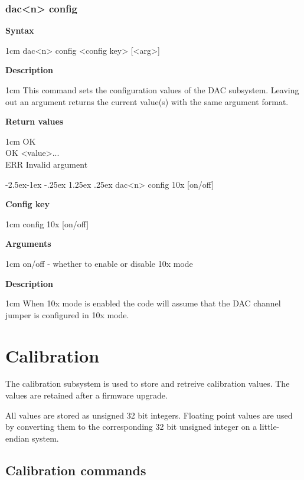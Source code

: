 \documentclass{article}[a4paper]
\makeatletter
\newcommand\subsubsubsection{\@startsection{paragraph}{4}{\z@}%
            {-2.5ex\@plus -1ex \@minus -.25ex}%
            {1.25ex \@plus .25ex}%
            {\normalfont\normalsize\bfseries}}
\makeatother
\begin{document}
\subsubsection{dac<n> config}
\begin{tcolorbox}
	{\bf Syntax}

	 1cm \dimexpr\linewidth-2cm\relax
	dac<n> config <config key> [<arg>]

	\medskip
	{\bf Description}

	 1cm \dimexpr\linewidth-2cm\relax
	This command sets the configuration values of the DAC subsystem.
	Leaving out an argument returns the current value(s) with the same argument
	format.

	\medskip
	{\bf Return values}

	 1cm \dimexpr\linewidth-2cm\relax
	OK \\
	OK <value>... \\
	ERR Invalid argument
\end{tcolorbox}

\subsubsubsection{dac<n> config 10x [on/off]}
\begin{tcolorbox}
	{\bf Config key}

	 1cm \dimexpr\linewidth-2cm\relax
	config 10x [on/off]

	\medskip
	{\bf Arguments}

	 1cm \dimexpr\linewidth-2cm\relax
	on/off - whether to enable or disable 10x mode

	\medskip
	{\bf Description}

	 1cm \dimexpr\linewidth-2cm\relax
	When 10x mode is enabled the code will assume that the DAC channel jumper is configured
	in 10x mode.
\end{tcolorbox}

\section{Calibration}

The calibration subsystem is used to store and retreive calibration values. The
values are retained after a firmware upgrade.

All values are stored as unsigned 32 bit integers. Floating point values are
used by converting them to the corresponding 32 bit unsigned integer on a
little-endian system.

\subsection{Calibration commands}
\end{document}
